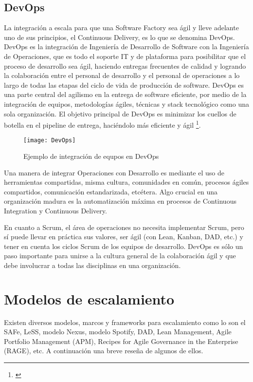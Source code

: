 \subsection{DevOps}

La integración a escala para que una Software Factory sea ágil y lleve adelante uno de sus principios, el Continuous Delivery, es lo que se denomina DevOps. DevOps es la integración de Ingeniería de Desarrollo de Software con la Ingeniería de Operaciones, que es todo el soporte IT y de plataforma para posibilitar que el proceso de desarrollo sea ágil, haciendo entregas frecuentes de calidad y logrando la colaboración entre el personal de desarrollo y el personal de operaciones a lo largo de todas las etapas del ciclo de vida de producción de software. DevOps es una parte central del agilismo en la entrega de software eficiente, por medio de la integración de equipos, metodologías ágiles, técnicas y stack tecnológico como una sola organización. El objetivo principal de DevOps es minimizar los cuellos de botella en el pipeline de entrega, haciéndolo más eficiente y ágil \footnote{\cite{DevOps-for-dummies-2015}}.

\begin{figure}[h]
  \centering
  \texttt{[image: DevOps]}
  \caption{Ejemplo de integración de equpos en DevOps}
  \centering
  \label{fig:DevOps} %
\end{figure}

Una manera de integrar Operaciones con Desarrollo es mediante el uso de herramientas compartidas, misma cultura, comunidades en común, procesos ágiles compartidos, comunicación estandarizada, etcétera. Algo crucial en una organización madura es la automatización máxima en procesos de Continuous Integration y Continuous Delivery.

En cuanto a Scrum, el área de operaciones no necesita implementar Scrum, pero sí puede llevar en práctica sus valores, ser ágil (con Lean, Kanban, DAD, etc.) y tener en cuenta los ciclos Scrum de los equipos de desarrollo. DevOps es sólo un paso importante para unirse a la cultura general de la colaboración ágil y que debe involucrar a todas las disciplinas en una organización. 


\section{Modelos de escalamiento}

Existen diversos modelos, marcos y frameworks para escalamiento como lo son el SAFe, LeSS, modelo Nexus, modelo Spotify, DAD, Lean Management, Agile Portfolio Management (APM), Recipes for Agile Governance in the Enterprise (RAGE), etc. A continuación una breve reseña de algunos de ellos.

